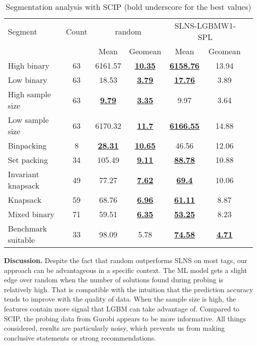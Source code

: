 \documentclass[3p, authoryear, times]{elsarticle}
\begin{document}
\begin{table}[h]
\centering
\caption{Segmentation analysis with SCIP (bold underscore for the best values)}
\label{tab:segmentation_scip}
\begin{tabular}{lcccccc}
\toprule
{Segment} & {Count} & \multicolumn{2}{c}{random} & \multicolumn{2}{c}{SLNS-LGBMW1-SPL} \\
{} & {} & {Mean} & {Geomean} & {Mean} & {Geomean} \\
\midrule
High binary & 63 & 6161.57 & \underline{\textbf{10.35}} & \underline{\textbf{6158.76}} & 13.94 \\
Low binary & 63 & 18.53 & \underline{\textbf{3.79}} & \underline{\textbf{17.76}} & 3.89 \\
High sample size & 63 & \underline{\textbf{9.79}} & \underline{\textbf{3.35}} & 9.97 & 3.64 \\
Low sample size & 63 & 6170.32 & \underline{\textbf{11.7}} & \underline{\textbf{6166.55}} & 14.88 \\
Binpacking & 8 & \underline{\textbf{28.31}} & \underline{\textbf{10.65}} & 46.56 & 12.06 \\
Set packing & 34 & 105.49 & \underline{\textbf{9.11}} & \underline{\textbf{88.78}} & 10.88 \\
Invariant knapsack & 49 & 77.27 & \underline{\textbf{7.62}} & \underline{\textbf{69.4}} & 10.06 \\
Knapsack & 59 & 68.76 & \underline{\textbf{6.96}} & \underline{\textbf{61.11}} & 8.87 \\
Mixed binary & 71 & 59.51 & \underline{\textbf{6.35}} & \underline{\textbf{53.25}} & 8.23 \\
Benchmark suitable & 33 & 98.09 & 5.78 & \underline{\textbf{74.58}} & \underline{\textbf{4.71}} \\
\bottomrule
\end{tabular}
\end{table}




\textbf{Discussion. } Despite the fact that random outperforms SLNS on most tags, our approach can be advantageous in a specific context. The ML model gets a slight edge over random when the number of solutions found during probing is relatively high. That is compatible with the intuition that the prediction accuracy tends to improve with the quality of data. When the sample size is high, the features contain more signal that LGBM can take advantage of. Compared to SCIP, the probing data from Gurobi appears to be more informative.  All things considered, results are particularly noisy, which prevents us from making conclusive statements or strong recommendations. 
\end{document}

